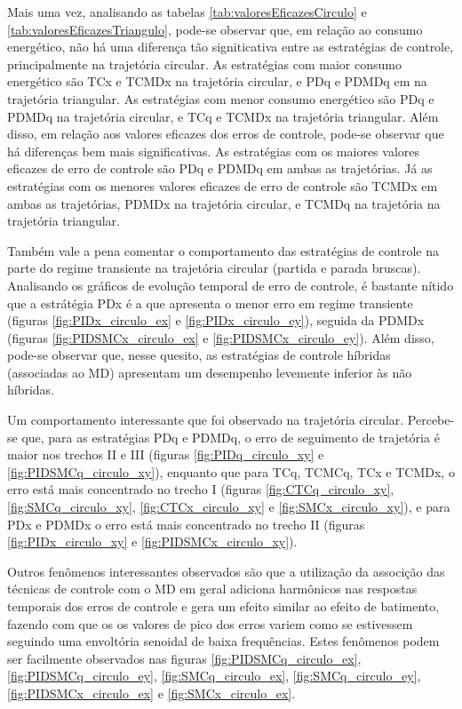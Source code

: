 \documentclass[]{politex}
\begin{document}
Mais uma vez, analisando as tabelas \ref{tab:valoresEficazesCirculo} e \ref{tab:valoresEficazesTriangulo}, pode-se observar que, em relação ao consumo energético, não há uma diferença tão signiticativa entre as estratégias de controle, principalmente na trajetória circular. As estratégias com maior consumo energético são TCx e TCMDx na trajetória circular, e PDq e PDMDq em na trajetória triangular. As estratégias com menor consumo energético são PDq e PDMDq na trajetória circular, e TCq e TCMDx na trajetória triangular. Além disso, em relação aos valores eficazes dos erros de controle, pode-se observar que há diferenças bem mais significativas. As estratégias com os maiores valores eficazes de erro de controle são PDq e PDMDq em ambas as trajetórias. Já as estratégias com os menores valores eficazes de erro de controle são TCMDx em ambas as trajetórias, PDMDx na trajetória circular, e TCMDq na trajetória na trajetória triangular.

Também vale a pena comentar o comportamento das estratégias de controle na parte do regime transiente na trajetória circular (partida e parada bruscas). Analisando os gráficos de evolução temporal de erro de controle, é bastante nítido que a estrátégia PDx é a que apresenta o menor erro em regime transiente (figuras \ref{fig:PIDx_circulo_ex} e \ref{fig:PIDx_circulo_ey}), seguida da PDMDx (figuras \ref{fig:PIDSMCx_circulo_ex} e \ref{fig:PIDSMCx_circulo_ey}). Além disso, pode-se observar que, nesse quesito, as estratégias de controle híbridas (associadas ao MD) apresentam um desempenho levemente inferior às não híbridas.

Um comportamento interessante que foi observado na trajetória circular. Percebe-se que, para as estratégias PDq e PDMDq, o erro de seguimento de trajetória é maior nos trechos II e III (figuras \ref{fig:PIDq_circulo_xy} e \ref{fig:PIDSMCq_circulo_xy}), enquanto que para TCq, TCMCq, TCx e TCMDx, o erro está mais concentrado no trecho I (figuras \ref{fig:CTCq_circulo_xy}, \ref{fig:SMCq_circulo_xy}, \ref{fig:CTCx_circulo_xy} e \ref{fig:SMCx_circulo_xy}), e para PDx e PDMDx o erro está mais concentrado no trecho II (figuras \ref{fig:PIDx_circulo_xy} e \ref{fig:PIDSMCx_circulo_xy}).

Outros fenômenos interessantes observados são que a utilização da associção das técnicas de controle com o MD em geral adiciona harmônicos nas respostas temporais dos erros de controle e gera um efeito similar ao efeito de batimento, fazendo com que os os valores de pico dos erros variem como se estivessem seguindo uma envoltória senoidal de baixa frequências. Estes fenômenos podem ser facilmente observados nas figuras \ref{fig:PIDSMCq_circulo_ex}, \ref{fig:PIDSMCq_circulo_ey}, \ref{fig:SMCq_circulo_ex}, \ref{fig:SMCq_circulo_ey}, \ref{fig:PIDSMCx_circulo_ex} e \ref{fig:SMCx_circulo_ex}.
\end{document}

